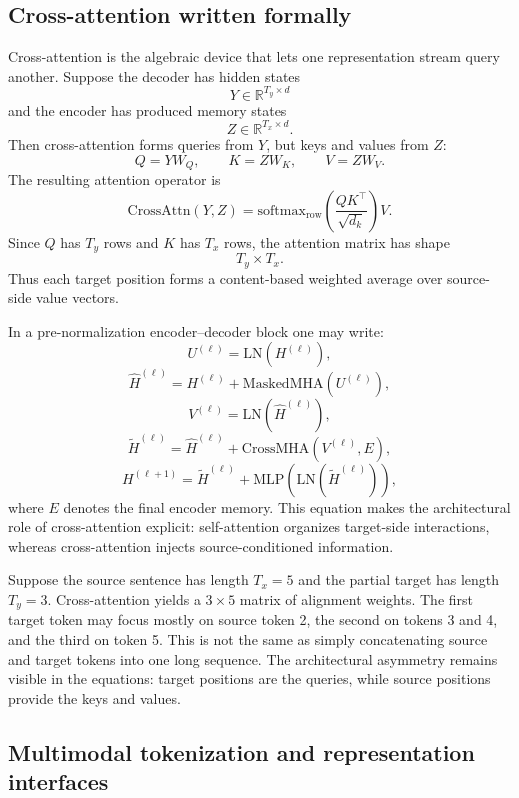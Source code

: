 \subsection*{Cross-attention written formally}

Cross-attention is the algebraic device that lets one representation stream query another.
Suppose the decoder has hidden states
\[
Y \in \mathbb{R}^{T_y \times d}
\]
and the encoder has produced memory states
\[
Z \in \mathbb{R}^{T_x \times d}.
\]
Then cross-attention forms queries from \(Y\), but keys and values from \(Z\):
\[
Q = YW_Q,
\qquad
K = ZW_K,
\qquad
V = ZW_V.
\]
The resulting attention operator is
\[
\mathrm{CrossAttn}(Y,Z)
=
\mathrm{softmax}_{\mathrm{row}}\!\left(\frac{QK^{\top}}{\sqrt{d_k}}\right)V.
\]
Since \(Q\) has \(T_y\) rows and \(K\) has \(T_x\) rows, the attention matrix has shape
\[
T_y \times T_x.
\]
Thus each target position forms a content-based weighted average over source-side value vectors.

In a pre-normalization encoder--decoder block one may write:
\[
U^{(\ell)} = \mathrm{LN}(H^{(\ell)}),
\]
\[
\widehat{H}^{(\ell)}
=
H^{(\ell)} + \mathrm{MaskedMHA}(U^{(\ell)}),
\]
\[
V^{(\ell)} = \mathrm{LN}(\widehat{H}^{(\ell)}),
\]
\[
\widetilde{H}^{(\ell)}
=
\widehat{H}^{(\ell)} + \mathrm{CrossMHA}(V^{(\ell)}, E),
\]
\[
H^{(\ell+1)}
=
\widetilde{H}^{(\ell)} + \mathrm{MLP}(\mathrm{LN}(\widetilde{H}^{(\ell)})),
\]
where \(E\) denotes the final encoder memory.
This equation makes the architectural role of cross-attention explicit:
self-attention organizes target-side interactions, whereas cross-attention injects source-conditioned information.

\begin{example}
Suppose the source sentence has length \(T_x=5\) and the partial target has length \(T_y=3\).
Cross-attention yields a \(3 \times 5\) matrix of alignment weights.
The first target token may focus mostly on source token 2, the second on tokens 3 and 4, and the third on token 5.
This is not the same as simply concatenating source and target tokens into one long sequence.
The architectural asymmetry remains visible in the equations: target positions are the queries, while source positions provide the keys and values.
\end{example}

\subsection*{Multimodal tokenization and representation interfaces}

